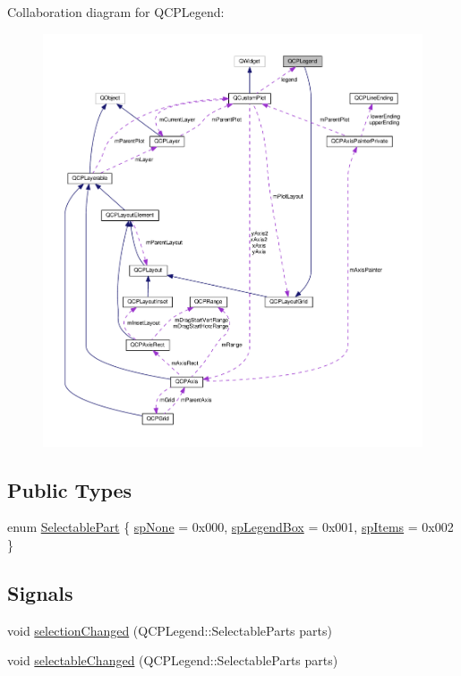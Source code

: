 Collaboration diagram for Q\+C\+P\+Legend\+:\nopagebreak
\begin{figure}[H]
\begin{center}
\leavevmode
\includegraphics[width=350pt]{classQCPLegend__coll__graph}
\end{center}
\end{figure}
\subsection*{Public Types}
\begin{DoxyCompactItemize}
\item 
enum \hyperlink{classQCPLegend_a5404de8bc1e4a994ca4ae69e2c7072f1}{Selectable\+Part} \{ \hyperlink{classQCPLegend_a5404de8bc1e4a994ca4ae69e2c7072f1a378201c07d500af7126e3ec91652eed7}{sp\+None} = 0x000, 
\hyperlink{classQCPLegend_a5404de8bc1e4a994ca4ae69e2c7072f1a0fa4758962a46fa1dc9da818abae23c4}{sp\+Legend\+Box} = 0x001, 
\hyperlink{classQCPLegend_a5404de8bc1e4a994ca4ae69e2c7072f1a768bfb95f323db4c66473375032c0af7}{sp\+Items} = 0x002
 \}
\end{DoxyCompactItemize}
\subsection*{Signals}
\begin{DoxyCompactItemize}
\item 
void \hyperlink{classQCPLegend_a82c88464edac07a9eefaf3906268df3b}{selection\+Changed} (Q\+C\+P\+Legend\+::\+Selectable\+Parts parts)
\item 
void \hyperlink{classQCPLegend_a8a77300fd0976d6bdd8000f4e8d114b8}{selectable\+Changed} (Q\+C\+P\+Legend\+::\+Selectable\+Parts parts)
\end{DoxyCompactItemize}
